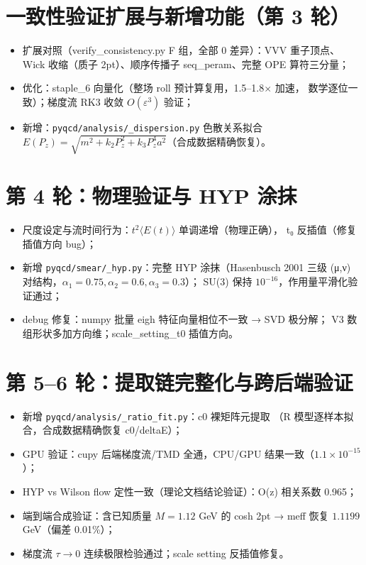 \documentclass[12pt,a4paper]{ctexart}
\begin{document}
\section{一致性验证扩展与新增功能（第 3 轮）}

\begin{itemize}
  \item 扩展对照（verify\_consistency.py F 组，全部 0 差异）：VVV 重子顶点、
        Wick 收缩（质子 2pt）、顺序传播子 seq\_peram、完整 OPE 算符三分量；
  \item 优化：staple\_6 向量化（整场 roll 预计算复用，1.5--1.8$\times$ 加速，
        数学逐位一致）；梯度流 RK3 收敛 $O(\varepsilon^3)$ 验证；
  \item 新增：\texttt{pyqcd/analysis/\_dispersion.py} 色散关系拟合
        $E(P_z) = \sqrt{m^2 + k_2 P_z^2 + k_3 P_z^4 a^2}$（合成数据精确恢复）。
\end{itemize}

\section{第 4 轮：物理验证与 HYP 涂抹}

\begin{itemize}
  \item 尺度设定与流时间行为：$t^2\langle E(t)\rangle$ 单调递增（物理正确），
        t₀ 反插值（修复插值方向 bug）；
  \item 新增 \texttt{pyqcd/smear/\_hyp.py}：完整 HYP 涂抹（Hasenbusch 2001
        三级 (μ,ν) 对结构，$\alpha_1{=}0.75, \alpha_2{=}0.6, \alpha_3{=}0.3$）；
        SU(3) 保持 $10^{-16}$，作用量平滑化验证通过；
  \item debug 修复：numpy 批量 eigh 特征向量相位不一致 → SVD 极分解；
        V3 数组形状多加方向维；scale\_setting\_t0 插值方向。
\end{itemize}

\section{第 5--6 轮：提取链完整化与跨后端验证}

\begin{itemize}
  \item 新增 \texttt{pyqcd/analysis/\_ratio\_fit.py}：c0 裸矩阵元提取
        （R 模型逐样本拟合，合成数据精确恢复 c0/deltaE）；
  \item GPU 验证：cupy 后端梯度流/TMD 全通，CPU/GPU 结果一致（$1.1\times10^{-15}$）；
  \item HYP vs Wilson flow 定性一致（理论文档结论验证）：O(z) 相关系数 0.965；
  \item 端到端合成验证：含已知质量 $M=1.12$ GeV 的 cosh 2pt →
        meff 恢复 $1.1199$ GeV（偏差 0.01\%）；
  \item 梯度流 $\tau\to 0$ 连续极限检验通过；scale setting 反插值修复。
\end{itemize}
\end{document}

